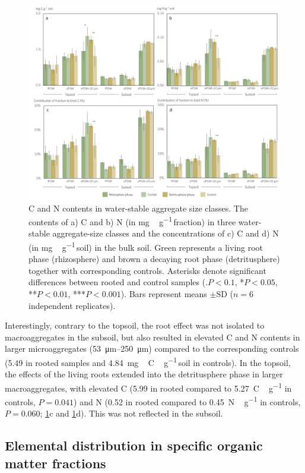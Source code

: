 \begin{figure}[H]
	\centering
	\includegraphics[width=1\textwidth]{img/M5-Figure_1.png}
	\caption{C and N contents in water-stable aggregate size classes. The contents of a) C and b) N (in \si{mg\,\gram^{-1}}\,fraction) in three water-stable aggregate-size classes and the concentrations of c) C and d) N (in \si{mg\,\gram^{-1}}\,soil) in the bulk soil. Green represents a living root phase (rhizosphere) and brown a decaying root phase (detritusphere) together with corresponding controls. Asterisks denote significant differences between rooted and control samples (\(.P < 0.1\), *\(P < 0.05\), **\(P < 0.01\), ***\(P < 0.001\)). Bars represent means \(\pm\)SD (\(n=6\) independent replicates).}
	\label{fig:M5-F1}
\end{figure}

Interestingly, contrary to the topsoil, the root effect was not isolated to macroaggregates in the subsoil, but also resulted in elevated C and N contents in larger microaggregates (\SIrange{53}{250}{\micro\metre}) compared to the corresponding controls (\num{5.49} in rooted samples and \SI{4.84}{mg\,C\,\gram^{-1}}\,soil in controls). In the topsoil, the effects of the living roots extended into the detritusphere phase in larger macroaggregates, with elevated C (\num{5.99} in rooted compared to \SI{5.27}{C\,\gram^{-1}} in controls, \(P=0.041\)) and N (\num{0.52} in rooted compared to \SI{0.45}{N\,\gram^{-1}} in controls, \(P=0.060\); \ref{fig:M5-F1}c and \ref{fig:M5-F1}d). This was not reflected in the subsoil.

\subsection{Elemental distribution in specific organic matter fractions}

